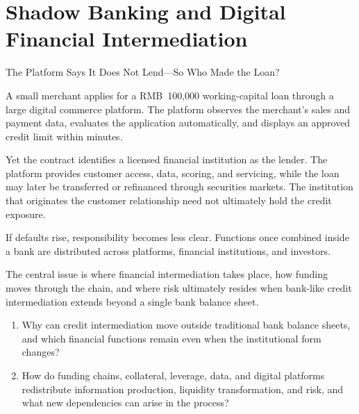 \chapter{Shadow Banking and Digital Financial Intermediation}
\label{chap:Shadow_Banking_and_Digital_Financial_Intermediation}

\begin{openingcase}{The Platform Says It Does Not Lend---So Who Made the Loan?}

A small merchant applies for a RMB~100,000 working-capital loan through a large digital commerce platform. The platform observes the merchant's sales and payment data, evaluates the application automatically, and displays an approved credit limit within minutes.

Yet the contract identifies a licensed financial institution as the lender. The platform provides customer access, data, scoring, and servicing, while the loan may later be transferred or refinanced through securities markets. The institution that originates the customer relationship need not ultimately hold the credit exposure.

If defaults rise, responsibility becomes less clear. Functions once combined inside a bank are distributed across platforms, financial institutions, and investors.

The central issue is where financial intermediation takes place, how funding moves through the chain, and where risk ultimately resides when bank-like credit intermediation extends beyond a single bank balance sheet.
\end{openingcase}

\begin{tcolorbox}[
  enhanced,
  colback=FinanceBlue!6,
  colframe=FinanceBlue,
  boxrule=0.6pt,
  sharp corners,
  left=8pt,
  right=8pt,
  top=7pt,
  bottom=7pt,
  before skip=1em,
  after skip=1.6em,
  title=\textbf{Core Questions},
  coltitle=white,
  colbacktitle=FinanceBlue,
  fonttitle=\bfseries,
  attach boxed title to top left={xshift=6pt,yshift=-2mm},
  boxed title style={boxrule=0pt,sharp corners,left=5pt,right=5pt,top=2pt,bottom=2pt}
]
\begin{enumerate}[leftmargin=*,label=\textcolor{FinanceBlue}{\textbf{\arabic*.}},itemsep=0.55em,topsep=0.2em]
\item Why can credit intermediation move outside traditional bank balance sheets, and which financial functions remain even when the institutional form changes?

\item How do funding chains, collateral, leverage, data, and digital platforms redistribute information production, liquidity transformation, and risk, and what new dependencies can arise in the process?
\end{enumerate}
\end{tcolorbox}

